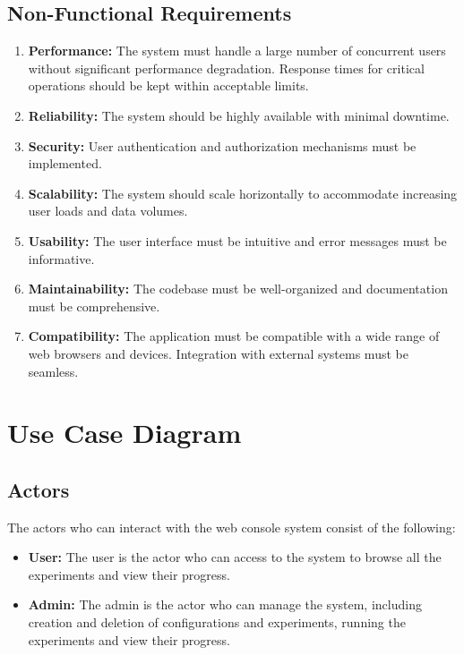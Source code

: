 \newpage
\subsection{Non-Functional Requirements}

\begin{enumerate}
    \item \textbf{Performance:} The system must handle a large number of concurrent users without significant performance degradation. Response times for critical operations should be kept within acceptable limits.
    \item \textbf{Reliability:} The system should be highly available with minimal downtime. 
    \item \textbf{Security:} User authentication and authorization mechanisms must be implemented.
    \item \textbf{Scalability:} The system should scale horizontally to accommodate increasing user loads and data volumes.
    \item \textbf{Usability:} The user interface must be intuitive and error messages must be informative.
    \item \textbf{Maintainability:} The codebase must be well-organized and documentation must be comprehensive.
    \item \textbf{Compatibility:} The application must be compatible with a wide range of web browsers and devices. Integration with external systems must be seamless.
\end{enumerate}

\section{Use Case Diagram}
\subsection{Actors}

The actors who can interact with the web console system consist of the following:
\begin{itemize}
    \item \textbf{User:} The user is the actor who can access to the system to browse all the experiments and view their progress.
    \item \textbf{Admin:} The admin is the actor who can manage the system, including creation and deletion of configurations and experiments, running the experiments and view their progress.
\end{itemize}

